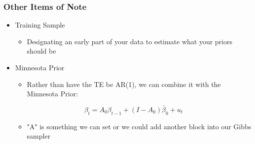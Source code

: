\scshape\documentclass[xcolor=svgnames]{beamer}
\begin{document}
\begin{frame}
\frametitle{Other Items of Note}
\begin{itemize}
	\item  Training Sample
	\begin{itemize}
		\item  Designating an early part of your data to estimate what your priors should be
	\end{itemize}
	\vspace{0.1 in}
	\item  Minnesota Prior
	\begin{itemize}
		\item  Rather than have the TE be AR(1), we can combine it with the Minnesota Prior:
	\end{itemize}
	\vspace{0.1 in}
	$$ \beta_t=A_0\beta_{t-1} + (I-A_0)\bar{\beta}_0+u_t $$
	\begin{itemize}
		\item  "A" is something we can set or we could add another block into our Gibbs sampler
	\end{itemize}
\end{itemize}
\end{frame}
\end{document}
